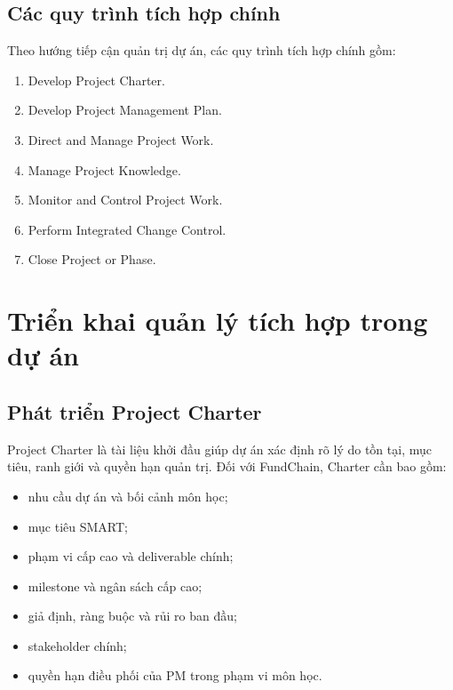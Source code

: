 \subsection{Các quy trình tích hợp chính}

Theo hướng tiếp cận quản trị dự án, các quy trình tích hợp chính gồm:

\begin{enumerate}
  \item Develop Project Charter.
  \item Develop Project Management Plan.
  \item Direct and Manage Project Work.
  \item Manage Project Knowledge.
  \item Monitor and Control Project Work.
  \item Perform Integrated Change Control.
  \item Close Project or Phase.
\end{enumerate}


\section{Triển khai quản lý tích hợp trong dự án}

\subsection{Phát triển Project Charter}

Project Charter là tài liệu khởi đầu giúp dự án xác định rõ lý do tồn tại, mục tiêu, ranh giới và quyền hạn quản trị. Đối với FundChain, Charter cần bao gồm:

\begin{itemize}
  \item nhu cầu dự án và bối cảnh môn học;
  \item mục tiêu SMART;
  \item phạm vi cấp cao và deliverable chính;
  \item milestone và ngân sách cấp cao;
  \item giả định, ràng buộc và rủi ro ban đầu;
  \item stakeholder chính;
  \item quyền hạn điều phối của PM trong phạm vi môn học.
\end{itemize}

